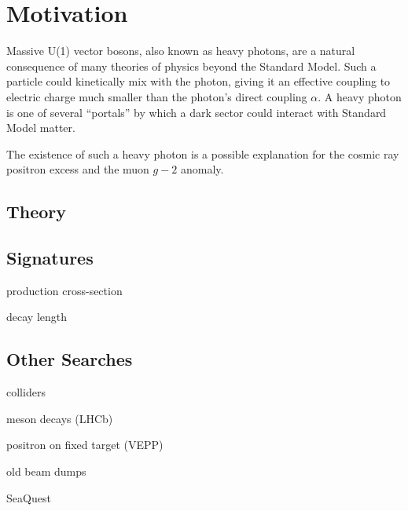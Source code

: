 \chapter{Motivation}
Massive U(1) vector bosons, also known as heavy photons, are a natural consequence of many theories of physics beyond the Standard Model.
Such a particle could kinetically mix with the photon, giving it an effective coupling to electric charge much smaller than the photon's direct coupling $\alpha$.
A heavy photon is one of several ``portals'' by which a dark sector could interact with Standard Model matter.

The existence of such a heavy photon is a possible explanation for the cosmic ray positron excess and the muon $g-2$ anomaly.

\section{Theory}


\section{Signatures}

production cross-section

decay length

\section{Other Searches}
colliders

meson decays (LHCb)

positron on fixed target (VEPP)

old beam dumps

SeaQuest
